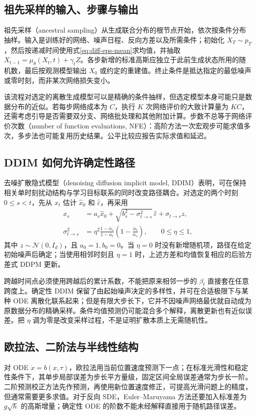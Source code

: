 \documentclass[UTF8,12pt,a4paper,fontset=fandol]{ctexart}
\begin{document}
\subsection{祖先采样的输入、步骤与输出}
祖先采样（ancestral sampling）从生成联合分布的根节点开始，依次按条件分布抽样。输入是训练好的网络、噪声日程、反向方差以及所需条件；初始化 $X_T\sim p_T$，然后按递减时间使用式\eqref{eq:diff-eps-mean}求均值，并抽取 $X_{t-1}=\mu_\theta(X_t,t)+\gamma_tZ$。各步新增的标准高斯应独立于此前生成状态所用的随机数，最后按观测模型输出 $X_0$ 或约定的重建值。终止条件是抵达指定的最低噪声或零时刻，而非某次网络损失变小。

该流程对选定的离散生成模型可以是精确的条件抽样，但选定模型本身可能只是数据分布的近似。若每步网络成本为 $C$，执行 $K$ 次网络评价的大致计算量为 $KC$，还需考虑引导是否需要双分支、网络批处理和其他附加计算。步数不总等于网络评价次数（number of function evaluations, NFE）：高阶方法一次宏观步可能求值多次，多步法也可能复用历史结果。公平比较应报告实际求值和延迟。

\subsection{DDIM 如何允许确定性路径}
去噪扩散隐式模型（denoising diffusion implicit model, DDIM）表明，可在保持相关单时刻扰动结构与学习目标联系的同时改变路径耦合\cite{song2021ddim}。对选定的两个时刻 $0\leq s<t$，先从 $x_t$ 估计 $\widehat x_0$ 和 $\widehat\varepsilon$，再采用
\begin{align}
 x_s&=a_s\widehat x_0+\sqrt{b_s^2-\sigma_{t\to s}^2}\,\widehat\varepsilon+\sigma_{t\to s}z,
 \label{eq:diff-ddim}\\
 \sigma_{t\to s}^2&=\eta^2\frac{1-\bar\alpha_s}{1-\bar\alpha_t}
 \left(1-\frac{\bar\alpha_t}{\bar\alpha_s}\right),\qquad 0\leq\eta\leq1,
 \label{eq:diff-ddim-var}
\end{align}
其中 $z\sim\mathcal N(0,I_d)$，且 $a_0=1,b_0=0$。当 $\eta=0$ 时没有新增随机项，路径在给定初始噪声后确定；当使用相邻时刻且 $\eta=1$ 时，上述方差和均值恢复相应的后验方差式 DDPM 更新。

跨越时间点必须使用跨越后的累计系数，不能把原来相邻一步的 $\beta_t$ 直接套在任意跨度上。确定性 DDIM 保留了由起始噪声决定的多样性，并可在合适极限下与某种 ODE 离散化联系起来；但是有限大步长下，它并不因噪声网络最优就自动成为原数据分布的精确采样。条件均值预测仍可能混合多个解释，离散更新也有近似误差。把 $\eta$ 调为零是改变采样过程，不是证明扩散本质上无需随机性。

\subsection{欧拉法、二阶法与半线性结构}
对 ODE $\dot x=b(x,\tau)$，欧拉法用当前位置速度预测下一点；在标准光滑性和稳定性条件下，其单步局部误差为步长平方量级，固定区间全局误差通常为步长一阶。二阶预测校正方法先作预测，再使用新位置速度修正，可提高光滑问题上的精度，但通常需要更多求值。对于反向 SDE，Euler--Maruyama 方法还要加入标准差为 $g\sqrt{h}$ 的高斯增量；确定性 ODE 的阶数不能未经解释直接用于随机路径误差。
\end{document}
